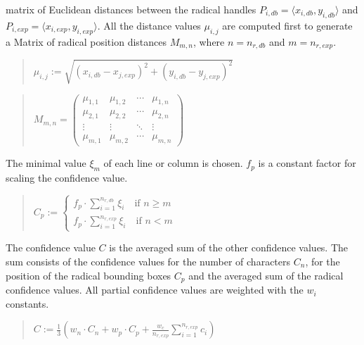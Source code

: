 matrix of Euclidean distances between the radical handles 
\(P_{i,db} = \langle x_{i,db},y_{i,db} \rangle  \) and 
\(P_{i,exp} = \langle x_{i,exp}, y_{i,exp} \rangle  \). All the distance values \( \mu_{i,j}\) are 
computed first to generate a Matrix of radical position distances 
\( M_{m,n}\), where
\( n = n_{r,db} \) and \( m = n_{r,exp} \).
\begin{quote}
\(
   \mu_{i,j} := \sqrt{(x_{i,db}-x_{j,exp})^2 + (y_{i,db}-y_{j,exp})^2}
\)
\end{quote}
\begin{quote}
\(
  M_{m,n} = 
  \begin{pmatrix}
   \mu_{1,1} & \mu_{1,2} & \cdots & \mu_{1,n} \\
   \mu_{2,1} & \mu_{2,2} & \cdots & \mu_{2,n} \\
   \vdots  & \vdots  & \ddots & \vdots  \\
   \mu_{m,1} & \mu_{m,2} & \cdots & \mu_{m,n} 
  \end{pmatrix}
\)
\end{quote}
The minimal value \( \xi_m \) of each line or column is chosen.
\( f_p \) is a constant factor for scaling the confidence value.
\begin{quote}
\(
  C_p := 
  \begin{cases}
    f_p \cdot \sum\limits_{i=1}^{n_{r,db}} \xi_i \quad \text{if } n \geq m \\
    f_p \cdot \sum\limits_{i=1}^{n_{r,exp}} \xi_i \quad \text{if } n < m
  \end{cases}
\)
\end{quote}
The confidence value \( C \) is the averaged sum of the other confidence
values. The sum consists of the confidence
values for the number of characters \( C_n\),
for the position of the radical bounding boxes \( C_p\)
and the averaged sum of the radical confidence values.
All partial confidence values are weighted with the \(w_i\) constants.
\begin{quote}
\(
    C := \frac{1}{3}
    (w_n \cdot C_n + w_p \cdot C_p + 
     \frac{w_c}{n_{r,exp}} \sum\limits_{i=1}^{n_{r,exp}} c_{i} )
\)
\end{quote}


  

